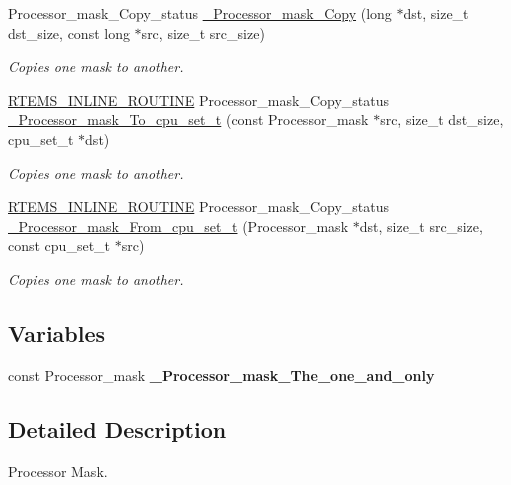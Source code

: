 \begin{DoxyCompactItemize}
Processor\+\_\+mask\+\_\+\+Copy\+\_\+status \mbox{\hyperlink{group__RTEMSScoreProcessorMask_gaf58dcb2d2b3e0a60d1b256c1c642fc77}{\+\_\+\+Processor\+\_\+mask\+\_\+\+Copy}} (long $\ast$dst, size\+\_\+t dst\+\_\+size, const long $\ast$src, size\+\_\+t src\+\_\+size)
\begin{DoxyCompactList}\small\item\em Copies one mask to another. \end{DoxyCompactList}\item 
\mbox{\hyperlink{group__RTEMSScoreBaseDefs_gac216239df231d5dbd15e3520b0b9313f}{R\+T\+E\+M\+S\+\_\+\+I\+N\+L\+I\+N\+E\+\_\+\+R\+O\+U\+T\+I\+NE}} Processor\+\_\+mask\+\_\+\+Copy\+\_\+status \mbox{\hyperlink{group__RTEMSScoreProcessorMask_ga55f2eda268b896560f99d2d984e4ead1}{\+\_\+\+Processor\+\_\+mask\+\_\+\+To\+\_\+cpu\+\_\+set\+\_\+t}} (const Processor\+\_\+mask $\ast$src, size\+\_\+t dst\+\_\+size, cpu\+\_\+set\+\_\+t $\ast$dst)
\begin{DoxyCompactList}\small\item\em Copies one mask to another. \end{DoxyCompactList}\item 
\mbox{\hyperlink{group__RTEMSScoreBaseDefs_gac216239df231d5dbd15e3520b0b9313f}{R\+T\+E\+M\+S\+\_\+\+I\+N\+L\+I\+N\+E\+\_\+\+R\+O\+U\+T\+I\+NE}} Processor\+\_\+mask\+\_\+\+Copy\+\_\+status \mbox{\hyperlink{group__RTEMSScoreProcessorMask_gafe442b4177fe941ca996d6888e88712b}{\+\_\+\+Processor\+\_\+mask\+\_\+\+From\+\_\+cpu\+\_\+set\+\_\+t}} (Processor\+\_\+mask $\ast$dst, size\+\_\+t src\+\_\+size, const cpu\+\_\+set\+\_\+t $\ast$src)
\begin{DoxyCompactList}\small\item\em Copies one mask to another. \end{DoxyCompactList}\end{DoxyCompactItemize}
\subsection*{Variables}
\begin{DoxyCompactItemize}
\item 
\mbox{\label{group__RTEMSScoreProcessorMask_ga9d3d97d56aef65044773dc5ac1b848f0}} 
const Processor\+\_\+mask {\bfseries \+\_\+\+Processor\+\_\+mask\+\_\+\+The\+\_\+one\+\_\+and\+\_\+only}
\end{DoxyCompactItemize}


\subsection{Detailed Description}
Processor Mask. 

